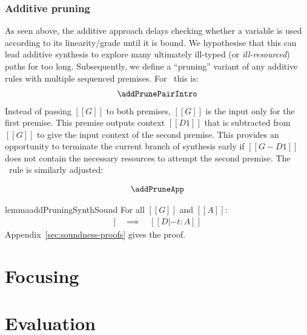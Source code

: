 \subsubsection{Additive pruning}
%
As seen above, the additive approach delays checking
whether a variable is used according to its linearity/grade
until it is bound. We hypothesise that this can lead additive synthesis to explore
many ultimately ill-typed (or \emph{ill-resourced})
paths for too long. Subsequently, we define a ``pruning''
variant of any additive rules with multiple sequenced
premises. For \addPairIntroName\ this is:
%
\begin{align*}
  \begin{array}{c}
    \addPrunePairIntro
  \end{array}
\end{align*}
%
Instead of passing $[[G]]$ to both
premises, $[[G]]$ is the input only for
the first premise. This premise outputs context $[[D1]]$ that
is subtracted from $[[G]]$ to give the input context
of the second premise. This provides an opportunity to
terminate the current branch of synthesis early if $[[ G - D1
]]$ does not contain the necessary resources to attempt the
second premise.
The \addAppName\ rule is similarly adjusted:

\begin{align*}
  \begin{array}{c}
    \addPruneApp
  \end{array}
\end{align*}

\begin{restatable}{lemma}{addPruningSynthSound}
\label{lemma:addPruningSynthSound} For all $[[ G ]]$ and $[[ A ]]$:
%
\begin{align*}
[[ G |- A =>+ t ; D ]] \quad \implies \quad [[ D |- t : A ]]
\end{align*}
Appendix~\ref{sec:soundness-proofs} gives the proof.
\end{restatable}

\section{Focusing}

\section{Evaluation}

